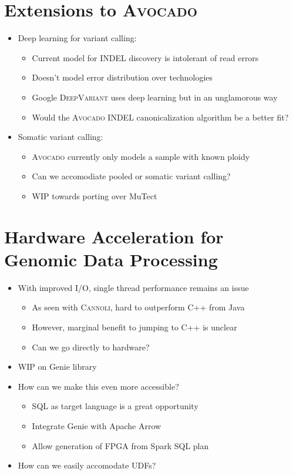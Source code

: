 \documentclass[phd]{ucbthesis}
\begin{document}
\section{Extensions to \textsc{Avocado}}
\label{sec:extending-avocado}

\begin{itemize}
\item Deep learning for variant calling:
  \begin{itemize}
  \item Current model for INDEL discovery is intolerant of read errors
  \item Doesn't model error distribution over technologies
  \item Google \textsc{DeepVariant} uses deep learning but in an unglamorous way
  \item Would the \textsc{Avocado} INDEL canonicalization algorithm be a better fit?
  \end{itemize}
\item Somatic variant calling:
  \begin{itemize}
  \item \textsc{Avocado} currently only models a sample with known ploidy
  \item Can we accomodiate pooled or somatic variant calling?
  \item WIP towards porting over MuTect
  \end{itemize}
\end{itemize}

\section{Hardware Acceleration for Genomic Data Processing}
\label{sec:genomic-hardware}

\begin{itemize}
\item With improved I/O, single thread performance remains an issue
  \begin{itemize}
  \item As seen with \textsc{Cannoli}, hard to outperform C++ from Java
  \item However, marginal benefit to jumping to C++ is unclear
  \item Can we go directly to hardware?
  \end{itemize}
\item WIP on Genie library
\item How can we make this even more accessible?
  \begin{itemize}
  \item SQL as target language is a great opportunity
  \item Integrate Genie with Apache Arrow
  \item Allow generation of FPGA from Spark SQL plan
  \end{itemize}
\item How can we easily accomodate UDFs?
\end{itemize}
\end{document}
